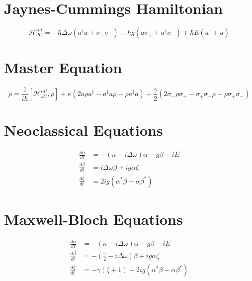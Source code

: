 \documentclass[reqno]{amsart}
\begin{document}
  \section{Jaynes-Cummings Hamiltonian}
  \begin{equation}
    \mathscr{H}^{int}_{JC} = -\hbar\Delta\omega(a^\dagger a + \sigma_+ \sigma_-)
     + \hbar g ( a\sigma_+ + a^\dagger \sigma_- ) + \hbar E ( a^\dagger + a )
  \end{equation}
  \section{Master Equation}
  \begin{equation}
    \dot{\rho} = \frac{1}{i\hbar} [\mathscr{H}^{int}_{JC}, \rho] + \kappa (2a\rho a^\dagger - a^\dagger a\rho - \rho a^\dagger a)+ \frac{\gamma}{2}(2\sigma_- \rho \sigma_+ - \sigma_+ \sigma_- \rho - \rho \sigma_+ \sigma_-)
  \end{equation}
  \section{Neoclassical Equations}
  \begin{align}
    \frac{d \alpha}{dt} &= -(\kappa - i \Delta\omega)\alpha - g\beta -iE \\
    \frac{d \beta}{dt} &= i\Delta\omega\beta + ig\alpha\zeta \\
    \frac{d \zeta}{dt} &= 2ig(\alpha^*\beta - \alpha\beta^*)
  \end{align}
  \section{Maxwell-Bloch Equations}
  \begin{align}
    \frac{d \alpha}{dt} &= -(\kappa - i \Delta\omega)\alpha - g\beta -iE \\
    \frac{d \beta}{dt} &= -(\frac{\gamma}{2} - i\Delta\omega)\beta + ig\alpha\zeta \\
    \frac{d \zeta}{dt} &= -\gamma(\zeta+1) + 2ig(\alpha^*\beta - \alpha\beta^*)
  \end{align}
\end{document}
